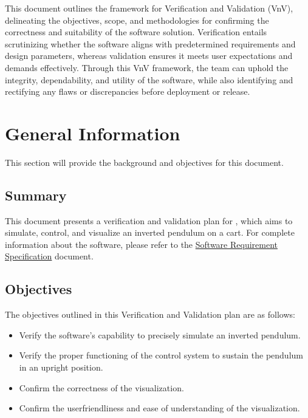 \documentclass[12pt, titlepage]{article}
\begin{document}

\newpage


This document outlines the framework for Verification and Validation (VnV),
delineating the objectives, scope, and methodologies for confirming
the correctness and suitability of the software solution. Verification entails
scrutinizing whether the software aligns with predetermined requirements and
design parameters, whereas validation ensures it meets user expectations and
demands effectively. Through this VnV framework, the team can uphold the integrity,
dependability, and utility of the software, while also identifying and
rectifying any flaws or discrepancies before deployment or release.

\section{General Information}
This section will provide the background and objectives for this document.

\subsection{Summary}

This document presents a verification and validation plan for \progname{},
which aims to simulate, control, and visualize an inverted pendulum on a cart.
For complete information about the software, please refer to the
\href{https://github.com/mirzaim/ipcs/blob/main/docs/SRS/SRS.pdf}{Software
  Requirement Specification} document.


\subsection{Objectives}

The objectives outlined in this Verification and Validation plan are as follows:

\begin{itemize}
  \item Verify the software's capability to precisely simulate an
        inverted pendulum.
  \item Verify the proper functioning of the control system to sustain
        the pendulum in an upright position.
  \item Confirm the correctness of the visualization.
  \item Confirm the userfriendliness and ease of understanding of the
        visualization.
\end{itemize}
\end{document}
